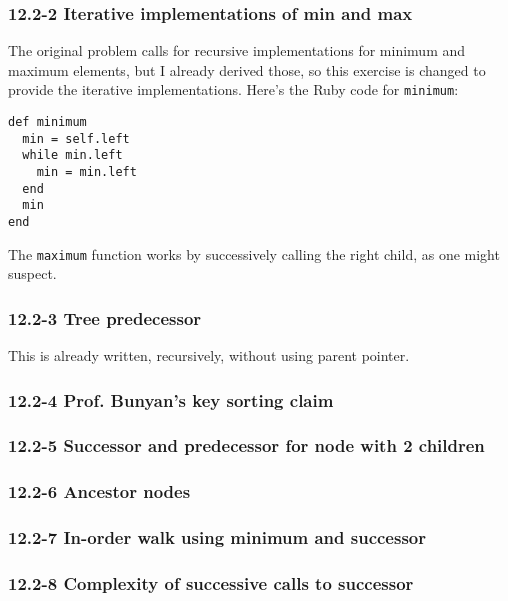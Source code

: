 \documentclass{article}
\begin{document}
\subsubsection{12.2-2 Iterative implementations of min and max}

The original problem calls for recursive implementations for minimum
and maximum elements, but I already derived those, so this exercise
is changed to provide the iterative implementations. Here's the
Ruby code for \texttt{minimum}:

\begin{lstlisting}[frame=single]
def minimum
  min = self.left
  while min.left
    min = min.left
  end
  min
end
\end{lstlisting}

The \texttt{maximum} function works by successively calling the right
child, as one might suspect.

\subsubsection{12.2-3 Tree predecessor}

This is already written, recursively, without using parent pointer.


\subsubsection{12.2-4 Prof. Bunyan's key sorting claim}

\subsubsection{12.2-5 Successor and predecessor for node with 2 children}

\subsubsection{12.2-6 Ancestor nodes}

\subsubsection{12.2-7 In-order walk using minimum and successor}

\subsubsection{12.2-8 Complexity of successive calls to successor}
\end{document}
